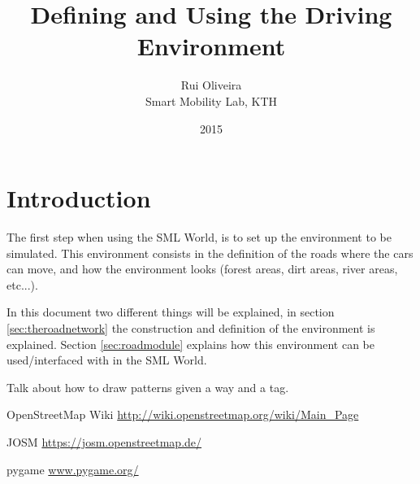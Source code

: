 \documentclass[10pt,a4paper]{article}
\begin{document}
\title{Defining and Using the Driving Environment}
\date{2015}
\author{Rui Oliveira\\ Smart Mobility Lab, KTH}

\maketitle

\tableofcontents

\section{Introduction}

The first step when using the SML World, is to set up the environment to be simulated. This environment consists in the definition of the roads where the cars can move, and how the environment looks (forest areas, dirt areas, river areas, etc...).

In this document two different things will be explained, in section \ref{sec:theroadnetwork} the construction and definition of the environment is explained. Section \ref{sec:roadmodule} explains how this environment can be used/interfaced with in the SML World.







Talk about how to draw patterns given a way and a tag.


\begin{thebibliography}{9}

OpenStreetMap Wiki \url{http://wiki.openstreetmap.org/wiki/Main_Page}

JOSM \url{https://josm.openstreetmap.de/}

pygame \url{www.pygame.org/}

\end{thebibliography}
\end{document}

